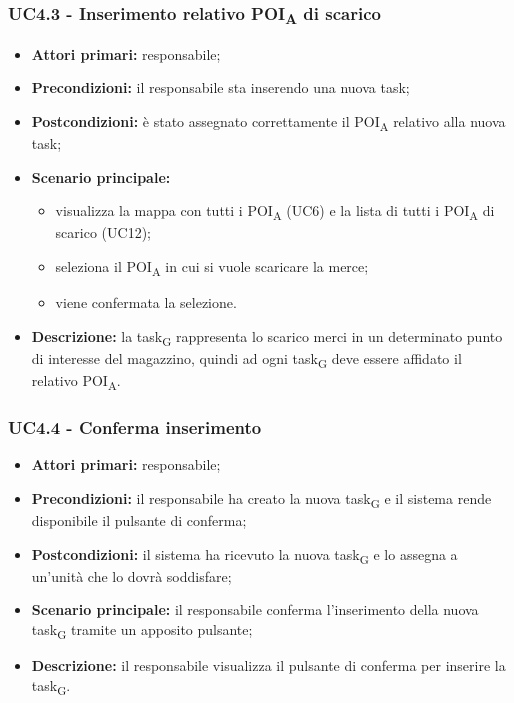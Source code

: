 \subsubsection{UC4.3 - Inserimento relativo \acrshort{POI}\textsubscript{A} di scarico}

\begin{itemize}
	\item 	\textbf{Attori primari:} responsabile;
	\item 	\textbf{Precondizioni:} il responsabile sta inserendo una nuova task;
	\item 	\textbf{Postcondizioni:} è stato assegnato correttamente il \acrshort{POI}\textsubscript{A} relativo alla nuova task;
	\item 	\textbf{Scenario principale:}
	\begin{itemize}
		\item visualizza la mappa con tutti i \acrshort{POI}\textsubscript{A} (UC6) e la lista di tutti i \acrshort{POI}\textsubscript{A} di scarico (UC12);
		\item seleziona il \acrshort{POI}\textsubscript{A} in cui si vuole scaricare la merce;
		\item viene confermata la selezione.
	\end{itemize}
	\item 	\textbf{Descrizione:} la \gls{task}\textsubscript{G} rappresenta lo scarico merci in un determinato punto di interesse del magazzino, quindi ad ogni \gls{task}\textsubscript{G} deve essere affidato il relativo \acrshort{POI}\textsubscript{A}.
\end{itemize}
\subsubsection{UC4.4 - Conferma inserimento}

\begin{itemize}
	\item 	\textbf{Attori primari:} responsabile;
	\item 	\textbf{Precondizioni:} il responsabile ha creato la nuova \gls{task}\textsubscript{G} e il sistema rende disponibile il pulsante di conferma;
	\item 	\textbf{Postcondizioni:} il sistema ha ricevuto la nuova \gls{task}\textsubscript{G} e lo assegna a un'unità che lo dovrà soddisfare;
	\item 	\textbf{Scenario principale:} il responsabile conferma l'inserimento della nuova \gls{task}\textsubscript{G} tramite un apposito pulsante;
	\item 	\textbf{Descrizione:} il responsabile visualizza il pulsante di conferma per inserire la \gls{task}\textsubscript{G}.
\end{itemize}

